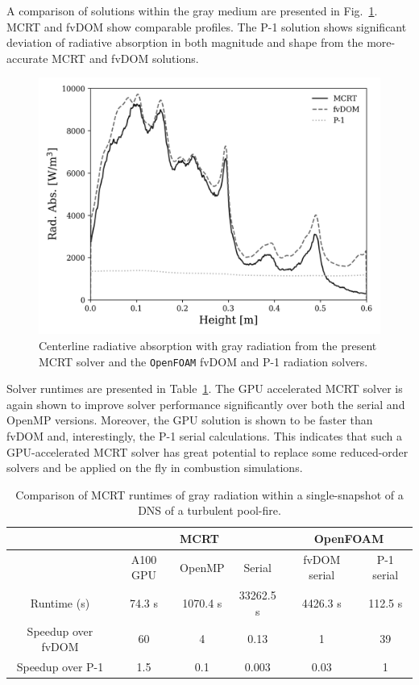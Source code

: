 A comparison of solutions within the gray medium are presented in Fig.~\ref{fig:PoolFireVerificationLine2}. MCRT and fvDOM show comparable profiles. The P-1 solution shows significant deviation of radiative absorption in both magnitude and shape from the more-accurate MCRT and fvDOM solutions. 
\begin{figure}[!h]
\centering
\includegraphics[width=0.6\linewidth]{figures/ch4/comparison_verification.png}
\caption{Centerline radiative absorption with gray radiation from the present MCRT solver and the \texttt{OpenFOAM} fvDOM and P-1 radiation solvers.}
\label{fig:PoolFireVerificationLine2}
\end{figure}

Solver runtimes are presented in Table~\ref{table:PoolFireRuntimesGray}. The GPU accelerated MCRT solver is again shown to improve solver performance significantly over both the serial and OpenMP versions. Moreover, the GPU solution is shown to be faster than fvDOM and, interestingly, the P-1 serial calculations. This indicates that such a GPU-accelerated MCRT solver has great potential to replace some reduced-order solvers and be applied on the fly in combustion simulations.



\begin{table}
\caption{Comparison of MCRT runtimes of gray radiation within a single-snapshot of a DNS of a turbulent pool-fire.}
\label{table:PoolFireRuntimesGray}
\centering
\begin{tabular}{c c c c c c} 
\hline
&\multicolumn{3}{c}{\bfseries MCRT}&\multicolumn{2}{c}{\bfseries OpenFOAM} \\
 \hline
 ~ & A100 GPU & OpenMP & Serial & fvDOM serial & P-1 serial \\ [0.5ex] 
 \hline
 Runtime (s) & 74.3 s & 1070.4 s & 33262.5 s & 4426.3 s & 112.5 s \\ 
 Speedup over fvDOM & 60 & 4 & 0.13 & 1 & 39 \\
 Speedup over P-1 & 1.5 & 0.1 & 0.003 & 0.03 & 1 \\
 \hline
\end{tabular}
\end{table}



